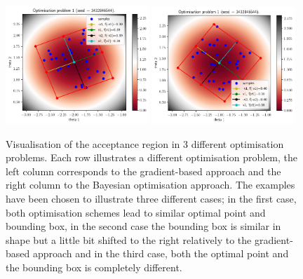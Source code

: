 \begin{figure}[h]
    \begin{center}
      \includegraphics[width=0.48\textwidth]{./Thesis/images/chapter4/ex2D_region_1.png}
      \includegraphics[width=0.48\textwidth]{./Thesis/images/chapter4/ex2D_region_1_bo.png}
    \end{center}
    \caption{Visualisation of the acceptance region in 3 different
      optimisation problems. Each row illustrates a different
      optimisation problem, the left column corresponds to the
      gradient-based approach and the right column to the Bayesian
      optimisation approach. The examples have been chosen to
      illustrate three different cases; in the first case, both
      optimisation schemes lead to similar optimal point and bounding
      box, in the second case the bounding box is similar in shape but
      a little bit shifted to the right relatively to the
      gradient-based approach and in the third case, both the optimal
      point and the bounding box is completely different.}
  \label{fig:ex2_2}
\end{figure}


